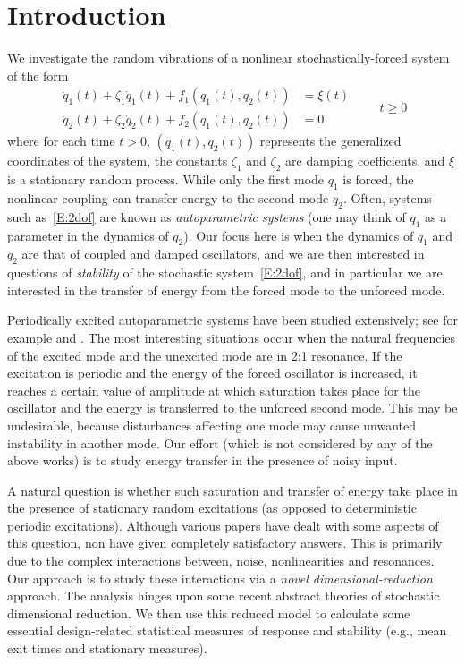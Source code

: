 \section{Introduction}
\label{S:introduction}
We investigate the random vibrations of a nonlinear stochastically-forced system of the form
\begin{equation}
\begin{aligned} 
\ddot q_1(t) + \zeta_1 \dot q_1(t) + f_1(q_1(t),q_2(t)) &= \xi (t)\\
\ddot q_2(t) + \zeta_2 \dot q_2(t) + f_2(q_1(t),q_2(t)) &= 0
\end{aligned}
\qquad t \ge 0
\label{E:2dof}
\end{equation}
where for each time $t > 0$, $(q_1(t), q_2(t))$ represents the generalized coordinates of the system, the constants $\zeta_1$ and $\zeta_2$ are damping coefficients, and $\xi$ is a stationary random process. While only the first mode $q_1$ is forced, the nonlinear coupling can transfer energy to the second mode $q_2$. Often, systems such as~\eqref{E:2dof} are known as \emph{autoparametric systems} (one may think of $q_1$ as a parameter in the dynamics of $q_2$). Our focus here is when the dynamics of $q_1$ and $q_2$ are that of coupled and damped oscillators, and we are then interested in questions of \emph{stability} of the stochastic system~\eqref{E:2dof}, and in particular we are interested in the transfer of energy from the forced mode to the unforced mode.


Periodically excited autoparametric systems have been studied extensively; see for example \citet{sethna65:_vibrat_of_dynam_system_with_qudrat_nonlin, haxton72:_autop_vibrat_absor, nayfeh79:_nonlin_oscil, hatwal83:_forced_nonlin_oscil_of_autop_1, bajaj96:_amplit_modul_dynam} and \citet{tien94:_nonlin_dynam_of_shall_arch}. The most interesting situations occur when the natural frequencies of the excited mode and the unexcited mode are in 2:1 resonance. If the excitation is periodic and the energy of the forced oscillator is increased, it reaches a certain value of amplitude at which saturation takes place for the oscillator and the energy is transferred to the unforced second mode. This may be undesirable, because disturbances affecting one mode may cause unwanted instability in another mode. Our effort (which is not considered by any of the above works) is to study energy transfer in the presence of noisy input.

A natural question is whether such saturation and transfer of energy take place in the presence of stationary random excitations (as opposed to deterministic periodic excitations). Although various papers have dealt with some aspects of this question, non have given completely satisfactory answers. This is primarily due to the complex interactions between, noise, nonlinearities and resonances. Our approach is to study these interactions via a \emph{novel dimensional-reduction} approach. The analysis hinges upon some recent abstract theories of stochastic dimensional reduction. We then use this reduced model to calculate some essential design-related statistical measures of response and stability (e.g., mean exit times and stationary measures).

